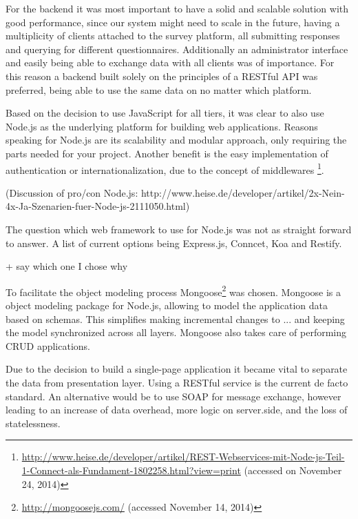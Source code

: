 		For the backend it was most important to have a solid and scalable solution with good performance, since our system might need to scale in the future, having a multiplicity of clients attached to the survey platform, all submitting responses and querying for different questionnaires. Additionally an administrator interface and easily being able to exchange data with all clients was of importance. For this reason a backend built solely on the principles of a RESTful API was preferred, being able to use the same data on no matter which platform.

		Based on the decision to use JavaScript for all tiers, it was clear to also use Node.js as the underlying platform for building web applications. Reasons speaking for Node.js are its scalability and modular approach, only requiring the parts needed for your project. Another benefit is the easy implementation of authentication or internationalization, due to the concept of middlewares \footnote{\url{http://www.heise.de/developer/artikel/REST-Webservices-mit-Node-js-Teil-1-Connect-als-Fundament-1802258.html?view=print} (accessed on November 24, 2014)}. 

				(Discussion of pro/con Node.js: http://www.heise.de/developer/artikel/2x-Nein-4x-Ja-Szenarien-fuer-Node-js-2111050.html)

		The question which web framework to use for Node.js was not as straight forward to answer. A list of current options being Express.js, Conncet, Koa and Restify. 

				+ say which one I chose why


		To facilitate the object modeling process Mongoose\footnote{\url{http://mongoosejs.com/} (accessed November 14, 2014)} was chosen. Mongoose is a object modeling package for Node.js, allowing to model the application data based on schemas. This simplifies making incremental changes to ... and keeping the model synchronized across all layers. 	Mongoose also takes care of performing CRUD applications.


		Due to the decision to build a single-page application it became vital to separate the data from presentation layer. Using a RESTful service is the current de facto standard. An alternative would be to use SOAP for message exchange, however leading to an increase of data overhead, more logic on server.side, and the loss of statelessness.

